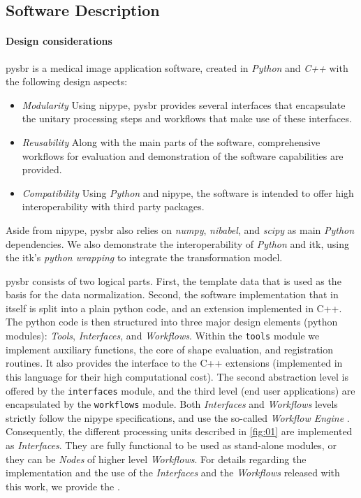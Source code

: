 \documentclass{frontiers}
\newcommand{\emitem}[1]{\item \emph{#1}}
\begin{document}
\subsection{Software Description}
\label{sec:software}
\paragraph{Design considerations}
\label{sec:design}

\Gls*{pysbr} is a medical image application software, created
  in \emph{Python} and \emph{C++} with the following design aspects:

\begin{itemize}
  \emitem{Modularity} Using \gls*{nipype}, \gls*{pysbr} provides
    several interfaces that encapsulate the unitary processing steps
    and workflows that make use of these interfaces.

  \emitem{Reusability} Along with the main parts of the software,
    comprehensive workflows for evaluation and demonstration of the 
    software capabilities are provided.

  \emitem{Compatibility} Using \emph{Python} and \gls*{nipype}, the
    software is intended to offer high interoperability with third party
      packages.
\end{itemize}

Aside from \gls*{nipype}, \Gls*{pysbr} also relies on \emph{numpy},
  \emph{nibabel}, and \emph{scipy} as main \emph{Python} dependencies.
We also demonstrate the interoperability of \emph{Python} and \gls*{itk},
  using the \gls*{itk}'s \emph{python wrapping} to integrate the
  transformation model. %

\Gls*{pysbr} consists of two logical parts.
First, the template data that is used as the basis for the data normalization.
Second, the software implementation that in itself is split into a plain
  python code, and an extension implemented in C++.
The python code is then structured into three major design elements (python modules):
  \emph{Tools}, \emph{Interfaces}, and \emph{Workflows}.
Within the \texttt{tools} module we implement auxiliary functions,
    the core of shape evaluation, and registration routines.
It also provides the interface to the C++ extensions
    (implemented in this language for their high computational cost).
The second abstraction level is offered by the \texttt{interfaces} module, and
  the third level (end user applications) are encapsulated by the \texttt{workflows} module.
Both \emph{Interfaces} and \emph{Workflows} levels strictly follow the
  \gls*{nipype} specifications, and use the so-called \emph{Workflow Engine}
  \citep{gorgolewski_nipype:_2011}.
Consequently, the different processing units described in \autoref{fig:01} 
  are implemented as \emph{Interfaces}. 
They are fully functional to be used as stand-alone modules, or 
  they can be \emph{Nodes} of higher level \emph{Workflows}.
For details regarding the implementation and the use of the \emph{Interfaces}
  and the \emph{Workflows} released with this work, we provide the .
\end{document}
